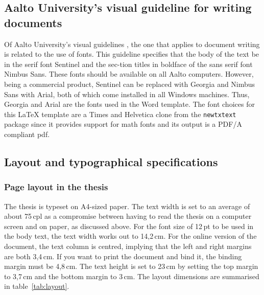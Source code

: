 \documentclass[english, 12pt, a4paper, elec, utf8, a-2b, online]{aaltothesis}
\begin{document}
\subsection*{Aalto University’s visual guideline for writing documents}

Of Aalto University’s visual guidelines \cite{aaltovisual}, the one that applies
to document writing is related to the use of fonts. This guideline specifies 
that the body of the text be in the serif font Sentinel and the sec-tion titles 
in boldface of the sans serif font Nimbus Sans. These fonts should be available 
on all Aalto computers. However, being a commercial product, Sentinel can be 
replaced with Georgia and Nimbus Sans with Arial, both of which come installed 
in all Windows machines. Thus, Georgia and Arial are the fonts used in the Word 
template. The font choices for this \LaTeX{} template are a Times and Helvetica 
clone from the \verb+newtxtext+ package since it provides support for math fonts
and its output is a PDF/A compliant pdf.

\subsection*{Layout and typographical specifications}
\subsubsection*{Page layout in the thesis}

The thesis is typeset on A4-sized paper. The text width is set to an average of 
about 75\,cpl as a compromise between having to read the thesis on a computer 
screen and on paper, as discussed above. For the font size of 12\,pt to be used 
in the body text, the text width works out to 14,2\,cm. For the online version 
of the document, the text column is centred, implying that the left and right 
margins are both 3,4\,cm. If you want to print the document and bind it, the 
binding margin must be 4,8\,cm. The text height is set to 23\,cm by setting the 
top margin to 3,7\,cm and the bottom margin to 3\,cm. The layout dimensions are 
summarised in table~\ref{tab:layout}.
\end{document}
